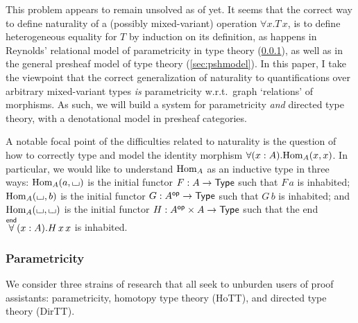 \documentclass{lmcs} %
\theoremstyle{plain}\newtheorem{satz}[thm]{Satz} %
\theoremstyle{plain}
\theoremstyle{definition}
\begin{document}
This problem appears to remain unsolved as of yet.
It seems that the correct way to define naturality of a (possibly mixed-variant) operation $\forall x.T\,x$, is to define heterogeneous equality for $T$ by induction on its definition, as happens in Reynolds' relational model of parametricity in type theory \cite{reynolds} (\cref{sec:intro:param}), as well as in the general presheaf model of type theory \cite[ch.\ 4]{Hofmann97} (\cref{sec:pshmodel}).
In this paper, I take the viewpoint that the correct generalization of naturality to quantifications over arbitrary mixed-variant types \emph{is} parametricity w.r.t.\ graph `relations' of morphisms.
As such, we will build a system for parametricity \emph{and} directed type theory, with a denotational model in presheaf categories.

A notable focal point of the difficulties related to naturality is the question of how to correctly type and model the identity morphism $\forall(x : A).{\mathrm{Hom}}_A(x, x)$.
In particular, we would like to understand ${\mathrm{Hom}}_A$ as an inductive type in three ways: ${\mathrm{Hom}}_A(a, {\llcorner\hspace{-.4ex}\lrcorner})$ is the initial functor $F : A \to {\mathsf{Type}}$ such that $F\,a$ is inhabited; ${\mathrm{Hom}}_A({\llcorner\hspace{-.4ex}\lrcorner}, b)$ is the initial functor $G : A^{\mathsf{op}} \to {\mathsf{Type}}$ such that $G\,b$ is inhabited; and ${\mathrm{Hom}}_A({\llcorner\hspace{-.4ex}\lrcorner}, {\llcorner\hspace{-.4ex}\lrcorner})$ is the initial functor $H : A^{\mathsf{op}} \times A \to {\mathsf{Type}}$ such that the end $\overset{\mathsf{end}}{\forall}(x : A).H\,x\,x$ is inhabited.


\subsubsection{Parametricity}\label{sec:intro:param}


We consider three strains of research that all seek to unburden users of proof assistants: parametricity, homotopy type theory (HoTT), and directed type theory (DirTT).
\end{document}
